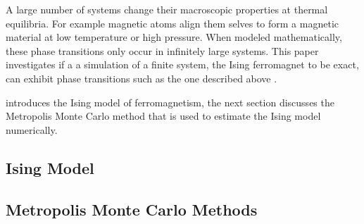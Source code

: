 A large number of systems change their macroscopic properties at thermal equilibria. For example magnetic atoms align them selves to form a magnetic material at low temperature or high pressure. When modeled mathematically, these phase transitions only occur in infinitely large systems. This paper investigates if a a simulation of a finite system, the Ising ferromagnet to be exact, can exhibit phase transitions such as the one described above \cite{kenzel1997physics}. 

 introduces the Ising model of ferromagnetism, the next section discusses the Metropolis Monte Carlo method that is used to estimate the Ising model numerically.

\subsection{Ising Model}
	\label{ss:intro:ising}
	

\subsection{Metropolis Monte Carlo Methods}
	\label{ss:intro:mmc}
	

